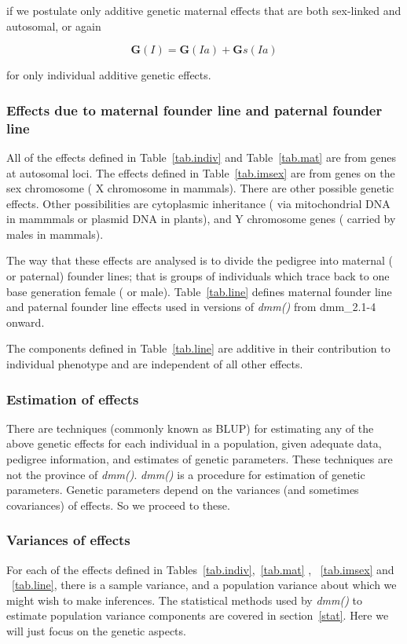 \documentclass[titlepage]{article}  %
\begin{document}
if we postulate only additive genetic maternal effects that are both sex-linked and autosomal, or again

\begin{displaymath}
{\bm G(I) = \bm G(Ia) + \bm Gs(Ia)}
\end{displaymath}

for only individual additive genetic effects.

\subsubsection{Effects due to maternal founder line and paternal founder line}
All of the effects defined in Table~\ref{tab.indiv} and Table~\ref{tab.mat} are from genes at autosomal loci. The effects defined in Table~\ref{tab.imsex} are from genes on the sex chromosome ( X chromosome in mammals). There are other possible genetic effects. Other possibilities are cytoplasmic inheritance ( via mitochondrial DNA in mammmals or plasmid DNA in plants), and Y chromosome genes ( carried by males in mammals).

The way that these effects are analysed is to divide the pedigree into maternal ( or paternal) founder lines; that is groups of individuals which trace back to one base generation female ( or male). 
Table~\ref{tab.line} defines maternal founder line and paternal founder line effects used in versions of {\em dmm()} from dmm\_2.1-4 onward. 



The components defined in Table~\ref{tab.line} are additive  in their contribution to individual phenotype and are independent of all other effects. 

\subsubsection{Estimation of effects}
	There are techniques (commonly known as BLUP) for estimating any of the above genetic effects for each individual in a population, given adequate data, pedigree information, and estimates of genetic parameters. These techniques are not the province of {\em dmm()}. {\em dmm()} is a procedure for estimation of genetic parameters. Genetic parameters depend on the variances (and sometimes covariances) of effects. So we proceed to these.


\subsubsection{Variances of effects}
 For each of the effects defined in Tables~\ref{tab.indiv},~\ref{tab.mat} , ~\ref{tab.imsex} and ~\ref{tab.line}, there is a sample variance, and a population variance about which we might wish to make inferences. The statistical methods used by {\em dmm()} to estimate population variance components are covered in section~\ref{stat}. Here we will just focus on the genetic aspects.
\end{document}
